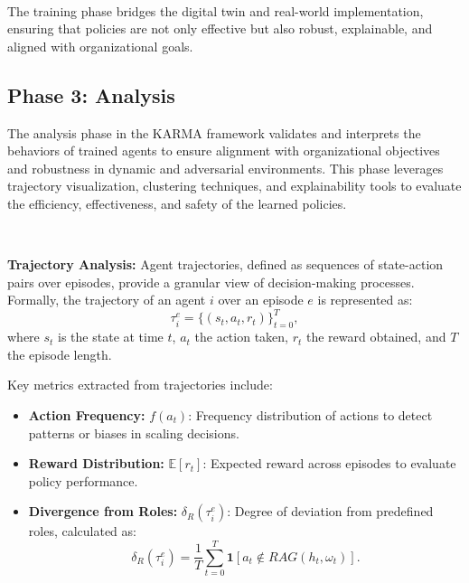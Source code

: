 \documentclass[conference]{IEEEtran}
\begin{document}
\

The training phase bridges the digital twin and real-world implementation, ensuring that policies are not only effective but also robust, explainable, and aligned with organizational goals.


\subsection{Phase 3: Analysis}

The analysis phase in the KARMA framework validates and interprets the behaviors of trained agents to ensure alignment with organizational objectives and robustness in dynamic and adversarial environments. This phase leverages trajectory visualization, clustering techniques, and explainability tools to evaluate the efficiency, effectiveness, and safety of the learned policies.

\

\noindent\textbf{Trajectory Analysis:} 
Agent trajectories, defined as sequences of state-action pairs over episodes, provide a granular view of decision-making processes. Formally, the trajectory of an agent \( i \) over an episode \( e \) is represented as:
\[
\tau_i^e = \{(s_t, a_t, r_t)\}_{t=0}^{T},
\]
where \( s_t \) is the state at time \( t \), \( a_t \) the action taken, \( r_t \) the reward obtained, and \( T \) the episode length.

Key metrics extracted from trajectories include:
\begin{itemize}
    \item \textbf{Action Frequency:} \( f(a_t) \): Frequency distribution of actions to detect patterns or biases in scaling decisions.
    \item \textbf{Reward Distribution:} \( \mathbb{E}[r_t] \): Expected reward across episodes to evaluate policy performance.
    \item \textbf{Divergence from Roles:} \( \delta_R(\tau_i^e) \): Degree of deviation from predefined roles, calculated as:
    \[
    \delta_R(\tau_i^e) = \frac{1}{T} \sum_{t=0}^T \mathbf{1}[a_t \notin RAG(h_t, \omega_t)].
    \]
\end{itemize}
\end{document}
